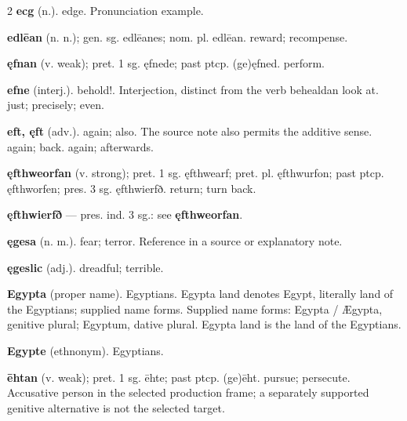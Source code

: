 \begin{multicols*}{2}
\textbf{ecg} (n.). edge. Pronunciation example.\par
\textbf{edlēan} (n. n.); gen. sg. edlēanes; nom. pl. edlēan. reward; recompense.\par
\textbf{ęfnan} (v. weak); pret. 1 sg. ęfnede; past ptcp. (ge)ęfned. perform.\par
\textbf{efne} (interj.). behold!. Interjection, distinct from the verb behealdan look at. just; precisely; even.\par
\textbf{eft, ęft} (adv.). again; also. The source note also permits the additive sense. again; back. again; afterwards.\par
\textbf{ęfthweorfan} (v. strong); pret. 1 sg. ęfthwearf; pret. pl. ęfthwurfon; past ptcp. ęfthworfen; pres. 3 sg. ęfthwierfð. return; turn back.\par
\textbf{ęfthwierfð} — pres. ind. 3 sg.: see \textbf{ęfthweorfan}.\par
\textbf{ęgesa} (n. m.). fear; terror. Reference in a source or explanatory note.\par
\textbf{ęgeslic} (adj.). dreadful; terrible.\par
\textbf{Egypta} (proper name). Egyptians. Egypta land denotes Egypt, literally land of the Egyptians; supplied name forms. Supplied name forms: Egypta / Ægypta, genitive plural; Egyptum, dative plural. Egypta land is the land of the Egyptians.\par
\textbf{Egypte} (ethnonym). Egyptians.\par
\textbf{ēhtan} (v. weak); pret. 1 sg. ēhte; past ptcp. (ge)ēht. pursue; persecute. Accusative person in the selected production frame; a separately supported genitive alternative is not the selected target.\par

\end{multicols*}
